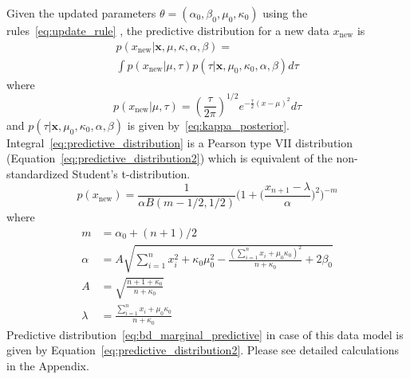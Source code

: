 %
Given the updated parameters
$\theta=(\alpha_0, \beta_0, \mu_0, \kappa_0)$ using the rules~\ref{eq:update_rule} ,
the predictive distribution for a new data $x_{\text{new}}$ is
%
\begin{multline}
    p(x_{\text{new}} | \pmb{x}, \mu, \kappa, \alpha, \beta) = \\
    \int p(x_{\text{new}} | \mu, \tau) p(\tau | \pmb{x}, \mu_0, \kappa_0, \alpha, \beta) d \tau
    \label{eq:predictive_distribution}
\end{multline}
%
where
%
\begin{equation}
p(x_{\text{new}} | \mu, \tau) = (\frac{\tau}{2 \pi})^{1/2} e^{-\frac{\tau}{2} (x-\mu)^2} d \tau
\end{equation}
%
and $p(\tau | \pmb{x}, \mu_0, \kappa_0, \alpha, \beta)$ is given by~\ref{eq:kappa_posterior}.
%
Integral~\ref{eq:predictive_distribution} is a Pearson type VII distribution (Equation~\ref{eq:predictive_distribution2}) which is
equivalent of the non-standardized Student's t-distribution.
\begin{equation}
p(x_{\text{new}})=\frac{1}{\alpha B(m - 1/2,1/2)} \Big (  1 + \Big (\frac{x_{n+1} - \lambda}{\alpha} \Big )^2 \Big )^{-m}
\label{eq:predictive_distribution2}
\end{equation}
%
where
%
\begin{align}
    m &= \alpha_0 + (n+1)/2\\
    \alpha &= A \sqrt{ \sum_{i=1}^{n} x_i^2 + \kappa_0 \mu_0^2 - \frac{( \sum_{i=1}^{n} x_i + \mu_0 \kappa_0 )^2}{n + \kappa_0} + 2 \beta_0 }\\
    A &= \sqrt{\frac{n+1+\kappa_0}{n+\kappa_0}}\\
    \lambda &= \frac{\sum_{i=1}^n x_i + \mu_0 \kappa_0}{n + \kappa_0}
    \label{eq:posteriro_parameters}
\end{align}
Predictive distribution~\ref{eq:bd_marginal_predictive} in case
of this data model is given by Equation~\ref{eq:predictive_distribution2}.
Please see detailed calculations in the Appendix.

